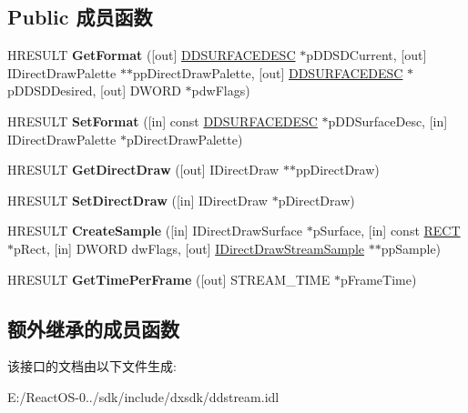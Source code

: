 \subsection*{Public 成员函数}
\begin{DoxyCompactItemize}
\item 
\mbox{\label{interface_i_direct_draw_media_stream_aaaed0cb5679dce5cff69a1b5c57c85b0}} 
H\+R\+E\+S\+U\+LT {\bfseries Get\+Format} (\mbox{[}out\mbox{]} \hyperlink{interfacevoid}{D\+D\+S\+U\+R\+F\+A\+C\+E\+D\+E\+SC} $\ast$p\+D\+D\+S\+D\+Current, \mbox{[}out\mbox{]} I\+Direct\+Draw\+Palette $\ast$$\ast$pp\+Direct\+Draw\+Palette, \mbox{[}out\mbox{]} \hyperlink{interfacevoid}{D\+D\+S\+U\+R\+F\+A\+C\+E\+D\+E\+SC} $\ast$p\+D\+D\+S\+D\+Desired, \mbox{[}out\mbox{]} D\+W\+O\+RD $\ast$pdw\+Flags)
\item 
\mbox{\label{interface_i_direct_draw_media_stream_a79aa35bbed556e843bc8c3b25a54021c}} 
H\+R\+E\+S\+U\+LT {\bfseries Set\+Format} (\mbox{[}in\mbox{]} const \hyperlink{interfacevoid}{D\+D\+S\+U\+R\+F\+A\+C\+E\+D\+E\+SC} $\ast$p\+D\+D\+Surface\+Desc, \mbox{[}in\mbox{]} I\+Direct\+Draw\+Palette $\ast$p\+Direct\+Draw\+Palette)
\item 
\mbox{\label{interface_i_direct_draw_media_stream_a1c82a58f0c6bbda0623ab8bfffa98bf0}} 
H\+R\+E\+S\+U\+LT {\bfseries Get\+Direct\+Draw} (\mbox{[}out\mbox{]} I\+Direct\+Draw $\ast$$\ast$pp\+Direct\+Draw)
\item 
\mbox{\label{interface_i_direct_draw_media_stream_aabced04420e647039d4c976138790a8b}} 
H\+R\+E\+S\+U\+LT {\bfseries Set\+Direct\+Draw} (\mbox{[}in\mbox{]} I\+Direct\+Draw $\ast$p\+Direct\+Draw)
\item 
\mbox{\label{interface_i_direct_draw_media_stream_a4fa2b0cd859f56dd494b889b1697b50a}} 
H\+R\+E\+S\+U\+LT {\bfseries Create\+Sample} (\mbox{[}in\mbox{]} I\+Direct\+Draw\+Surface $\ast$p\+Surface, \mbox{[}in\mbox{]} const \hyperlink{structtag_r_e_c_t}{R\+E\+CT} $\ast$p\+Rect, \mbox{[}in\mbox{]} D\+W\+O\+RD dw\+Flags, \mbox{[}out\mbox{]} \hyperlink{interface_i_direct_draw_stream_sample}{I\+Direct\+Draw\+Stream\+Sample} $\ast$$\ast$pp\+Sample)
\item 
\mbox{\label{interface_i_direct_draw_media_stream_a44ab9c8f848f84c5fad862554e9c3eab}} 
H\+R\+E\+S\+U\+LT {\bfseries Get\+Time\+Per\+Frame} (\mbox{[}out\mbox{]} S\+T\+R\+E\+A\+M\+\_\+\+T\+I\+ME $\ast$p\+Frame\+Time)
\end{DoxyCompactItemize}
\subsection*{额外继承的成员函数}


该接口的文档由以下文件生成\+:\begin{DoxyCompactItemize}
\item 
E\+:/\+React\+O\+S-\/0../sdk/include/dxsdk/ddstream.\+idl\end{DoxyCompactItemize}
